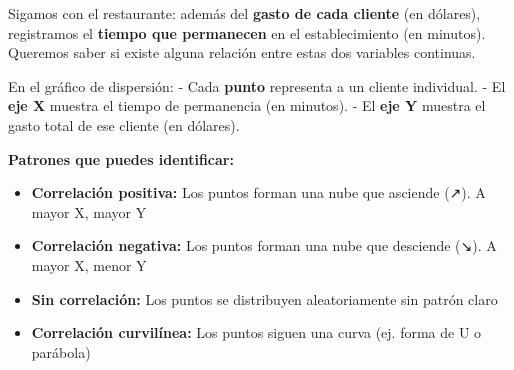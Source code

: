 \documentclass[
  spanish,
  letterpaper,
  DIV=11,
  numbers=noendperiod]{scrreprt}
\providecommand{\tightlist}{%
  \setlength{\itemsep}{0pt}\setlength{\parskip}{0pt}}
\begin{document}
Sigamos con el restaurante: además del \textbf{gasto de cada cliente}
(en dólares), registramos el \textbf{tiempo que permanecen} en el
establecimiento (en minutos). Queremos saber si existe alguna relación
entre estas dos variables continuas.

En el gráfico de dispersión: - Cada \textbf{punto} representa a un
cliente individual. - El \textbf{eje X} muestra el tiempo de permanencia
(en minutos). - El \textbf{eje Y} muestra el gasto total de ese cliente
(en dólares).

\textbf{Patrones que puedes identificar:}

\begin{tcolorbox}[enhanced jigsaw, toptitle=1mm, opacitybacktitle=0.6, leftrule=.75mm, arc=.35mm, title=\textcolor{quarto-callout-tip-color}{\faLightbulb}\hspace{0.5em}{Tipos de relaciones en un gráfico de dispersión}, colback=white, bottomrule=.15mm, colbacktitle=quarto-callout-tip-color!10!white, opacityback=0, bottomtitle=1mm, breakable, rightrule=.15mm, coltitle=black, left=2mm, titlerule=0mm, colframe=quarto-callout-tip-color-frame, toprule=.15mm]

\begin{itemize}
\tightlist
\item
  \textbf{Correlación positiva:} Los puntos forman una nube que asciende
  (↗). A mayor X, mayor Y
\item
  \textbf{Correlación negativa:} Los puntos forman una nube que
  desciende (↘). A mayor X, menor Y\\
\item
  \textbf{Sin correlación:} Los puntos se distribuyen aleatoriamente sin
  patrón claro
\item
  \textbf{Correlación curvilínea:} Los puntos siguen una curva (ej.
  forma de U o parábola)
\end{itemize}

\end{tcolorbox}
\end{document}
